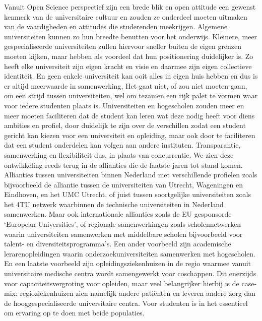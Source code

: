 \documentclass[empirical, authordate, ]{new-jote-article}
\begin{document}
	Vanuit Open Science perspectief zijn een brede blik en open attitude een gewenst kenmerk van de universitaire cultuur en zouden ze onderdeel moeten uitmaken van de vaardigheden en attitudes die studerenden meekrijgen. Algemene universiteiten kunnen zo hun breedte benutten voor het onderwijs. Kleinere, meer gespecialiseerde universiteiten zullen hiervoor sneller buiten de eigen grenzen moeten kijken, maar hebben als voordeel dat hun positionering duidelijker is. Zo heeft elke universiteit zijn eigen kracht en visie en daarmee zijn eigen collectieve identiteit. En geen enkele universiteit kan ooit alles in eigen huis hebben en dus is er altijd meerwaarde in samenwerking, Het gaat niet, of zou niet moeten gaan, om een strijd tussen universiteiten, wel om tezamen een rijk palet te vormen waar voor iedere studenten plaats is. Universiteiten en hogescholen zouden meer en meer moeten faciliteren dat de student kan leren wat deze nodig heeft voor diens ambities en profiel, door duidelijk te zijn over de verschillen zodat een student gericht kan kiezen voor een universiteit en opleiding, maar ook door te faciliteren dat een student onderdelen kan volgen aan andere instituten. Transparantie, samenwerking en flexibiliteit dus, in plaats van concurrentie. We zien deze ontwikkeling reeds terug in de allianties die de laatste jaren tot stand komen. Allianties tussen universiteiten binnen Nederland met verschillende profielen zoals bijvoorbeeld de alliantie tussen de universiteiten van Utrecht, Wageningen en Eindhoven, en het UMC Utrecht, of juist tussen soortgelijke universiteiten zoals het 4TU netwerk waarbinnen de technische universiteiten in Nederland samenwerken. Maar ook internationale allianties zoals de EU gesponsorde ‘European Universities', of regionale samenwerkingen zoals scholennetwerken waarin universiteiten samenwerken met middelbare scholen bijvoorbeeld voor talent- en diversiteitsprogramma's. Een ander voorbeeld zijn academische lerarenopleidingen waarin onderzoekuniversiteiten samenwerken met hogescholen. En een laatste voorbeeld zijn opleidingsziekenhuizen in de regio waarmee vanuit universitaire medische centra wordt samengewerkt voor coschappen. Dit enerzijds voor capaciteitsvergroting voor opleiden, maar veel belangrijker hierbij is de case-mix: regioziekenhuizen zien namelijk andere patiënten en leveren andere zorg dan de hooggespecialiseerde universitaire centra. Voor studenten is in het essentieel om ervaring op te doen met beide populaties.
\end{document}
